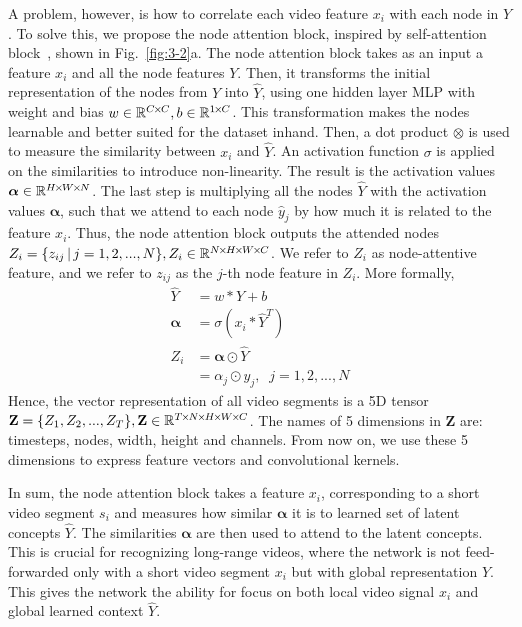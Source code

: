 \documentclass[10pt,twocolumn,letterpaper]{article}
\newcommand{\vbar}{\,|\,}
\begin{document}
A problem, however, is how to correlate each video feature $x_i$ with each node in $Y$.
To solve this, we propose the node attention block, inspired by self-attention block~\cite{wang2017non, vaswani2017attention, girdhar2018video}, shown in Fig.~\ref{fig:3-2}{\color{red}a}.
The node attention block takes as an input a feature $x_i$ and all the node features $Y$.
Then, it transforms the initial representation of the nodes from $Y$ into $\hat{Y}$, using one hidden layer MLP with weight and bias $w \in \mathbb{R}^{C {\mkern-2mu\times\mkern-2mu} C}, b \in \mathbb{R}^{1 {\mkern-2mu\times\mkern-2mu} C}$.
This transformation makes the nodes learnable and better suited for the dataset inhand.
Then, a dot product $\otimes$ is used to measure the similarity between $x_i$ and $\hat{Y}$.
An activation function $\sigma$ is applied on the similarities to introduce non-linearity.
The result is the activation values $\bm{\alpha} \in \mathbb{R}^{H {\mkern-2mu\times\mkern-2mu} W {\mkern-2mu\times\mkern-2mu} N}$.
The last step is multiplying all the nodes $\hat{Y}$ with the activation values $\bm{\alpha}$, such that we attend to each node $\hat{y}_j$ by how much it is related to the feature $x_i$.
Thus, the node attention block outputs the attended nodes $Z_i = \{ z_{ij} \vbar j = 1, 2, ...,N\}, Z_i \in \mathbb{R}^{N\timesnarrow H \timesnarrow W \timesnarrow C}$. We refer to $Z_i$ as node-attentive feature, and we refer to $z_{ij}$ as the $j$-th node feature in $Z_i$. More formally,
\begin{align} 
\hat{Y} & = w * Y + b
\label{eqn:3-1}
\\ 
\bm{\alpha} & = \sigma (x_i * \hat{Y}^{T})
\label{eqn:3-2}
\\
Z_i & = \bm{\alpha} \odot \hat{Y}
\nonumber
\\
  & = \alpha_j \odot y_j, \;\; j = 1, 2, ..., N
\label{eqn:3-3}
\end{align}
Hence, the vector representation of all video segments is a 5D tensor $\mathbf{Z} = \{ Z_1, Z_2, ..., Z_T \}, \mathbf{Z} \in \mathbb{R}^{T {\mkern-2mu\times\mkern-2mu} N {\mkern-2mu\times\mkern-2mu} H {\mkern-2mu\times\mkern-2mu} W {\mkern-2mu\times\mkern-2mu} C}$. The names of 5 dimensions in $\mathbf{Z}$ are: timesteps, nodes, width, height and channels.
From now on, we use these 5 dimensions to express feature vectors and convolutional kernels.

In sum, the node attention block takes a feature $x_i$, corresponding to a short video segment $s_i$ and measures how similar $\bm{\alpha}$ it is to learned set of latent concepts $\hat{Y}$.
The similarities $\bm{\alpha}$ are then used to attend to the latent concepts.
This is crucial for recognizing long-range videos, where the network is not feed-forwarded only with a short video segment $x_i$ but with global representation $Y$.
This gives the network the ability for focus on both local video signal $x_i$ and global learned context $\hat{Y}$.
\end{document}

